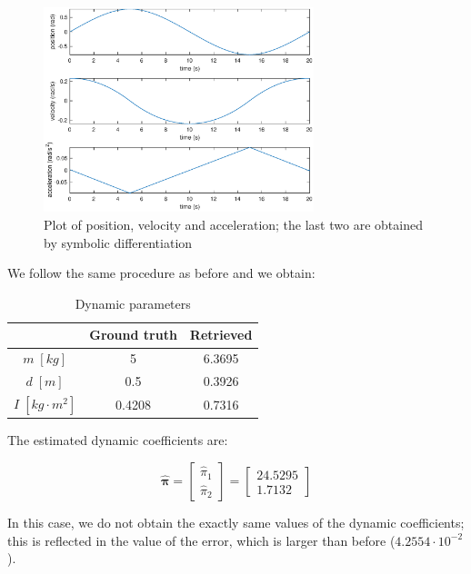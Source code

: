 \documentclass{article}
\begin{document}
\begin{figure}[!htbp]
\centering
\includegraphics[width=0.7\textwidth]{images/1-dof/trajectory_easy2.eps}
\caption{Plot of position, velocity and acceleration; the last two are obtained by symbolic differentiation}
\end{figure}
\FloatBarrier

We follow the same procedure as before and we obtain:

\begin{table}[!htbp]
\centering
\begin{tabular}{|c|cc|}
\hline
& Ground truth & Retrieved\\
\hline
$m\;[kg]$ & 5 & 6.3695\\ 
$d\;[m]$ & 0.5 & 0.3926\\
$I\;[kg\cdot m^2]$ & 0.4208 & 0.7316\\
\hline
\end{tabular}
\caption{Dynamic parameters}
\end{table}
\FloatBarrier

The estimated dynamic coefficients are:

\[\bm{\hat{\pi}}= \begin{bmatrix}
\hat{\pi}_1 \\\hat{ \pi}_2
\end{bmatrix} =
\begin{bmatrix}
24.5295 \\ 1.7132
\end{bmatrix}\]

In this case, we do not obtain the exactly same values of the dynamic coefficients; this is reflected in the value of the error, which is larger than before ($4.2554 \cdot 10^{-2}$).
\end{document}
